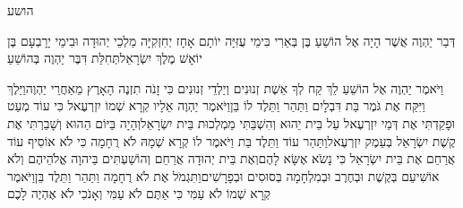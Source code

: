\documentclass[../main/main.tex]{subfiles}
\begin{document}
\thispagestyle{empty}
\Incipit{}הושע
\cleardoublepage
\RTLmulticolcolumns
\begin{multicols*}{\ncols}
דְּבַר יַהְוֶה אֲשֶׁר הָיָה אֶל הוֹשֵׁעַ בֶּן בְּאֵרִי בִּימֵי עֻזִּיָּה יוֹתָם אָחָז יְחִזְקִיָּה מַלְכֵי יְהוּדָה וּבִימֵי יָרָבְעָם בֶּן יוֹאָשׁ מֶלֶךְ יִשְׂרָאֵל\PreVerseSpace{}תְּחִלַּת דִּבֶּר יַהְוֶה בְּהוֹשֵׁעַ\OpenSection{}\par
וַיֹּאמֶר יַהְוֶה אֶל הוֹשֵׁעַ לֵךְ קַח לְךָ אֵשֶׁת זְנוּנִים וְיַלְדֵי זְנוּנִים כִּי זָנֹה תִזְנֶה הָאָרֶץ מֵאַחֲרֵי יַהְוֶה\PreVerseSpace{}וַיֵּלֶךְ וַיִּקַּח אֶת גֹּמֶר בַּת דִּבְלָיִם וַתַּהַר וַתֵּלֶד לוֹ בֵּן\PreVerseSpace{}וַיֹּאמֶר יַהְוֶה אֵלָיו קְרָא שְׁמוֹ יִזְרְעֶאל כִּי עוֹד מְעַט וּפָקַדְתִּי אֶת דְּמֵי יִזְרְעֶאל עַל בֵּית יֵהוּא וְהִשְׁבַּתִּי מַמְלְכוּת בֵּית יִשְׂרָאֵל\PreVerseSpace{}וְהָיָה בַּיּוֹם הַהוּא וְשָׁבַרְתִּי אֶת קֶשֶׁת יִשְׂרָאֵל בְּעֵמֶק יִזְרְעֶאל\PreVerseSpace{}וַתַּהַר עוֹד וַתֵּלֶד בַּת וַיֹּאמֶר לוֹ קְרָא שְׁמָהּ לֹא רֻחָמָה כִּי לֹא אוֹסִיף עוֹד אֲרַחֵם אֶת בֵּית יִשְׂרָאֵל כִּי נָשֹׂא אֶשָּׂא לָהֶם\PreVerseSpace{}וְאֶת בֵּית יְהוּדָה אֲרַחֵם וְהוֹשַׁעְתִּים בַּיהוָה אֱלֹהֵיהֶם וְלֹא אוֹשִׁיעֵם בְּקֶשֶׁת וּבְחֶרֶב וּבְמִלְחָמָה בְּסוּסִים וּבְפָרָשִׁים\PreVerseSpace{}וַתִּגְמֹל אֶת לֹא רֻחָמָה וַתַּהַר וַתֵּלֶד בֵּן\PreVerseSpace{}וַיֹּאמֶר קְרָא שְׁמוֹ לֹא עַמִּי כִּי אַתֶּם לֹא עַמִּי וְאָנֹכִי לֹא אֶהְיֶה לָכֶם\OpenSection{}\par

\end{multicols*}
\end{document}

